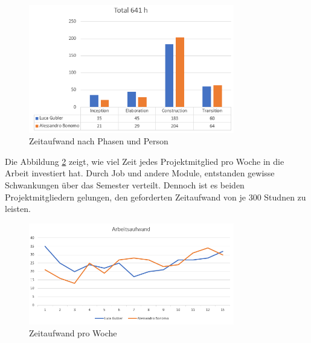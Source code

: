 	\begin{figure}[H]
		\begin{center}
\includegraphics[width=0.8\textwidth, height=\textheight, keepaspectratio]{images/Zeitauswertung/Prozentualer_Aufwand_Phasen_Effektiv.png}
		\caption{Zeitaufwand nach Phasen und Person}
		\label{time_per_phase_and_person}
		\end{center}		
\end{figure}

Die Abbildung \ref{time_per_Week} zeigt, wie viel Zeit jedes Projektmitglied pro Woche in die Arbeit investiert hat. Durch Job und andere Module, entstanden gewisse Schwankungen über das Semester verteilt. Dennoch ist es beiden Projektmitgliedern gelungen, den geforderten Zeitaufwand von je 300 Studnen zu leisten.

	\begin{figure}[H]
				\begin{center}
\includegraphics[width=0.8\textwidth, height=\textheight, keepaspectratio]{images/Zeitauswertung/Aufwand_Wochen.png}
		\caption{Zeitaufwand pro Woche}
		\label{time_per_Week}
		\end{center}		
\end{figure}


